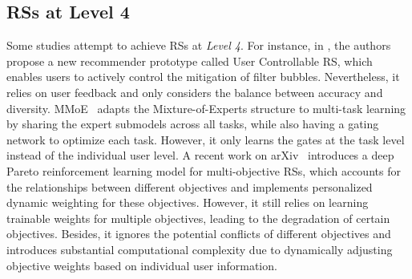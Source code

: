 \subsection{RSs at Level 4}
Some studies attempt to achieve RSs at \textit{Level 4}. For instance, in \cite{wang2022user}, the authors propose a new recommender prototype called User Controllable RS, which enables users to
actively control the mitigation of filter bubbles. Nevertheless, it relies on user feedback and only considers the balance between accuracy and diversity. 
MMoE~\cite{ma2018modeling} adapts the Mixture-of-Experts structure to multi-task learning by sharing the expert submodels across all tasks, while also having a gating network to optimize each task. However, it only learns the gates at the task level instead of the individual user level. A recent work on arXiv~\cite{li2024deep} introduces a deep Pareto reinforcement learning model for multi-objective RSs, which accounts for the relationships between different objectives and implements personalized dynamic weighting for these objectives. However, it still relies on learning trainable weights for multiple objectives, leading to the degradation of certain objectives. Besides, it ignores the potential conflicts of different objectives and introduces substantial computational complexity due to dynamically adjusting objective weights based on individual user information. 

